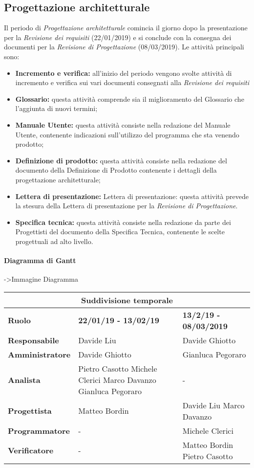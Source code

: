 \subsection{Progettazione architetturale}
Il periodo di \textit{Progettazione architetturale} comincia il giorno dopo la presentazione per la \textit{Revisione dei requisiti} (22/01/2019) e si conclude con la consegna dei documenti per la \textit{Revisione di Progettazione} (08/03/2019). Le attività principali sono:
\begin{itemize}
	\item{\textbf{Incremento e verifica:} all'inizio del periodo vengono svolte attività di incremento e verifica sui vari documenti consegnati alla \textit{Revisione dei requisiti}}
	\item{\textbf{Glossario:} questa attività comprende sia il miglioramento del Glossario che l’aggiunta di nuovi termini;}
	\item{\textbf{Manuale Utente:}  questa attività consiste nella redazione del Manuale Utente, contenente indicazioni sull’utilizzo del programma che sta venendo prodotto;}
	\item{\textbf{Definizione di prodotto:} questa attività consiste nella redazione del documento della Definizione di Prodotto contenente i dettagli della progettazione architetturale;}
	\item{\textbf{Lettera di presentazione:} Lettera di presentazione: questa attività prevede la stesura della Lettera di presentazione per la \textit{Revisione di Progettazione}.}
	\item{\textbf{Specifica tecnica:} questa attività consiste nella redazione da parte dei Progettisti del documento della Specifica Tecnica, contenente le scelte progettuali ad alto livello.}
\end{itemize}

\paragraph{Diagramma di Gantt}
->Immagine Diagramma

\begin{tabular}{|l|l|l|}
	\hline
	\multicolumn{3}{|c|}{\textbf{Suddivisione temporale}}\\
	\hline
	\textbf{Ruolo} & \textbf{22/01/19 - 13/02/19} & \textbf{13/2/19 - 08/03/2019} \\
	\hline
	\textbf{Responsabile} & Davide Liu & Davide Ghiotto \\
	\hline
	\textbf{Amministratore} & Davide Ghiotto & Gianluca Pegoraro \\
	\hline
	\textbf{Analista} & Pietro Casotto Michele Clerici Marco Davanzo Gianluca Pegoraro & - \\
	\hline
	\textbf{Progettista} & Matteo Bordin & Davide Liu Marco Davanzo \\
	\hline
	\textbf{Programmatore} & - & Michele Clerici \\
	\hline
	\textbf{Verificatore} & - & Matteo Bordin Pietro Casotto \\
	\hline
\end{tabular}

